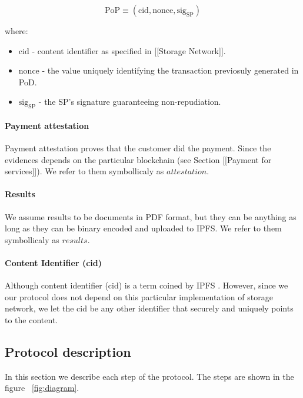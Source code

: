 \documentclass{ieeeaccess}
\begin{document}
\[\mathrm{PoP} \equiv (\mathrm{cid}, \mathrm{nonce}, \mathrm{sig}_\mathrm{SP})\]

where:

\begin{itemize}

\item
  \(\mathrm{cid}\) - content identifier as specified in {[}{[}Storage
  Network{]}{]}.
\item
  \(\mathrm{nonce}\) - the value uniquely identifying the transaction
  previosuly generated in PoD.
\item
  \(\mathrm{sig}_\mathrm{SP}\) - the SP's signature guaranteeing
  non-repudiation.
\end{itemize}

\paragraph{Payment attestation}\label{payment-attestation}

Payment attestation proves that the customer did the payment. Since the
evidences depends on the particular blockchain (see Section
{[}{[}Payment for services{]}{]}). We refer to them symbollicaly as
\(attestation\).

\paragraph{Results}\label{results}

We assume results to be documents in PDF format, but they can be
anything as long as they can be binary encoded and uploaded to IPFS. We
refer to them symbollicaly as \(results\).

\paragraph{Content Identifier (cid)}\label{content-identifier-cid}

Although content identifier (cid) is a term coined by IPFS
\cite{Contenta59}. However, since we our protocol does not depend on
this particular implementation of storage network, we let the cid be any
other identifier that securely and uniquely points to the content.

\subsection{Protocol description}\label{protocol-description}

In this section we describe each step of the protocol. The steps are
shown in the figure ~\ref{fig:diagram}.
\end{document}
